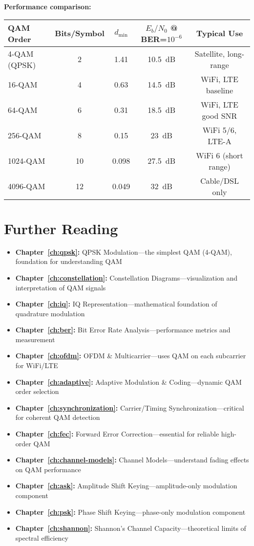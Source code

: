 \textbf{Performance comparison:}

\begin{center}
\begin{tabular}{@{}lcccc@{}}
\toprule
\textbf{QAM Order} & \textbf{Bits/Symbol} & \textbf{$d_{\min}$} & \textbf{$E_b/N_0$ @ BER=$10^{-6}$} & \textbf{Typical Use} \\
\midrule
4-QAM (QPSK) & 2 & 1.41 & 10.5~dB & Satellite, long-range \\
16-QAM & 4 & 0.63 & 14.5~dB & WiFi, LTE baseline \\
64-QAM & 6 & 0.31 & 18.5~dB & WiFi, LTE good SNR \\
256-QAM & 8 & 0.15 & 23~dB & WiFi 5/6, LTE-A \\
1024-QAM & 10 & 0.098 & 27.5~dB & WiFi 6 (short range) \\
4096-QAM & 12 & 0.049 & 32~dB & Cable/DSL only \\
\bottomrule
\end{tabular}
\end{center}

\section{Further Reading}

\begin{itemize}
\item \textbf{Chapter~\ref{ch:qpsk}:} QPSK Modulation---the simplest QAM (4-QAM), foundation for understanding QAM
\item \textbf{Chapter~\ref{ch:constellation}:} Constellation Diagrams---visualization and interpretation of QAM signals
\item \textbf{Chapter~\ref{ch:iq}:} IQ Representation---mathematical foundation of quadrature modulation
\item \textbf{Chapter~\ref{ch:ber}:} Bit Error Rate Analysis---performance metrics and measurement
\item \textbf{Chapter~\ref{ch:ofdm}:} OFDM \& Multicarrier---uses QAM on each subcarrier for WiFi/LTE
\item \textbf{Chapter~\ref{ch:adaptive}:} Adaptive Modulation \& Coding---dynamic QAM order selection
\item \textbf{Chapter~\ref{ch:synchronization}:} Carrier/Timing Synchronization---critical for coherent QAM detection
\item \textbf{Chapter~\ref{ch:fec}:} Forward Error Correction---essential for reliable high-order QAM
\item \textbf{Chapter~\ref{ch:channel-models}:} Channel Models---understand fading effects on QAM performance
\item \textbf{Chapter~\ref{ch:ask}:} Amplitude Shift Keying---amplitude-only modulation component
\item \textbf{Chapter~\ref{ch:psk}:} Phase Shift Keying---phase-only modulation component
\item \textbf{Chapter~\ref{ch:shannon}:} Shannon's Channel Capacity---theoretical limits of spectral efficiency
\end{itemize}
